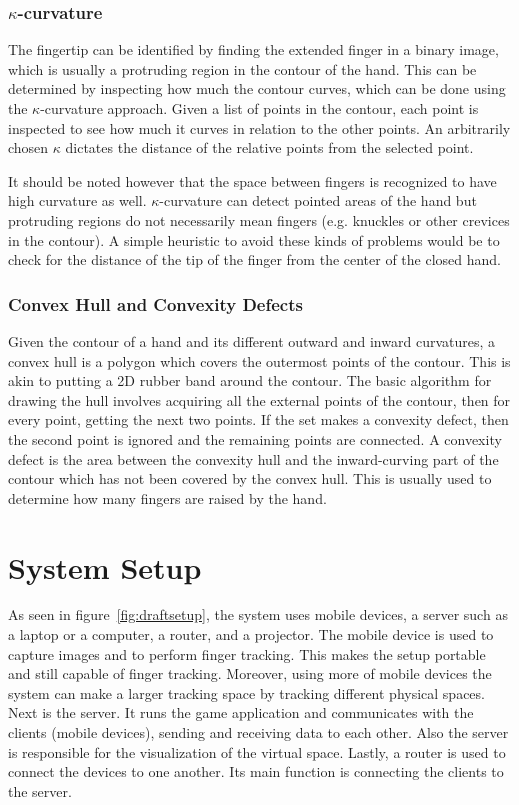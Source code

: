 \documentclass{acm_proc_article-sp}
\begin{document}
\subsubsection{$\kappa$-curvature}
The fingertip can be identified by finding the extended finger in a binary image, which is usually a protruding region in the contour of the hand. This can be determined by inspecting how much the contour curves, which can be done using the $\kappa$-curvature approach. Given a list of points in the contour, each point is inspected to see how much it curves in relation to the other points. An arbitrarily chosen $\kappa$ dictates the distance of the relative points from the selected point.

It should be noted however that the space between fingers is recognized to have high curvature as well. $\kappa$-curvature can detect pointed areas of the hand but protruding regions do not necessarily mean fingers (e.g. knuckles or other crevices in the contour). A simple heuristic to avoid these kinds of problems would be to check for the distance of the tip of the finger from the center of the closed hand.

\subsubsection{Convex Hull and Convexity Defects}
Given the contour of a hand and its different outward and inward curvatures, a convex hull is a polygon which covers the outermost points of the contour. This is akin to putting a 2D rubber band around the contour. The basic algorithm for drawing the hull involves acquiring all the external points of the contour, then for every point, getting the next two points. If the set makes a convexity defect, then the second point is ignored and the remaining points are connected. A convexity defect is the area between the convexity hull and the inward-curving part of the contour which has not been covered by the convex hull. This is usually used to determine how many fingers are raised by the hand.


\section{System Setup}


	As seen in figure~\ref{fig:draftsetup}, the system uses mobile devices, a server such as a laptop or a computer, a router, and a projector. The mobile device is used to capture images and to perform finger tracking. This makes the setup portable and still capable of finger tracking. Moreover, using more of mobile devices the system can make a larger tracking space by tracking different physical spaces. Next is the server. It runs the game application and communicates with the clients (mobile devices), sending and receiving data to each other. Also the server is responsible for the visualization of the virtual space. Lastly, a router is used to connect the devices to one another. Its main function is connecting the clients to the server.
\end{document}
